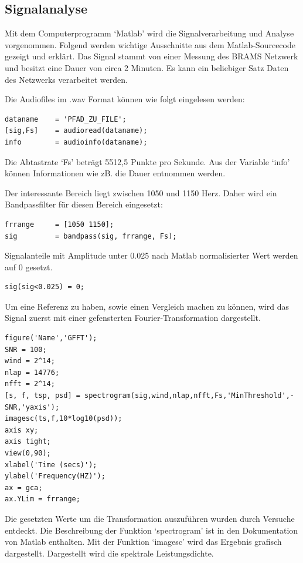 \begin{refsection}
\newpage
\subsection{Signalanalyse}
Mit dem Computerprogramm `Matlab' wird die Signalverarbeitung und Analyse vorgenommen.
Folgend werden wichtige Ausschnitte aus dem Matlab-Sourcecode gezeigt und erklärt.
Das Signal stammt von einer Messung des BRAMS Netzwerk und besitzt eine Dauer von circa 2 Minuten.
Es kann ein beliebiger Satz Daten des Netzwerks verarbeitet werden.

Die Audiofiles im .wav Format können wie folgt eingelesen werden:
\begin{lstlisting}
dataname    = 'PFAD_ZU_FILE';
[sig,Fs]    = audioread(dataname);
info        = audioinfo(dataname);
\end{lstlisting}
Die Abtastrate `Fs' beträgt 5512,5 Punkte pro Sekunde.
Aus der Variable `info' können Informationen wie zB. die Dauer entnommen werden. 

Der interessante Bereich liegt zwischen 1050 und 1150 Herz.
Daher wird ein Bandpassfilter für diesen Bereich eingesetzt:
\begin{lstlisting}
frrange     = [1050 1150];
sig         = bandpass(sig, frrange, Fs);
\end{lstlisting}

Signalanteile mit Amplitude unter 0.025 nach Matlab normalisierter Wert werden auf 0 gesetzt.
\begin{lstlisting}
sig(sig<0.025) = 0;
\end{lstlisting}

Um eine Referenz zu haben, sowie einen Vergleich machen zu können, wird das Signal zuerst mit einer gefensterten Fourier-Transformation dargestellt. 
\begin{lstlisting}
figure('Name','GFFT');
SNR = 100;
wind = 2^14;
nlap = 14776;
nfft = 2^14;
[s, f, tsp, psd] = spectrogram(sig,wind,nlap,nfft,Fs,'MinThreshold',-SNR,'yaxis');
imagesc(ts,f,10*log10(psd));
axis xy; 
axis tight; 
view(0,90);
xlabel('Time (secs)');
ylabel('Frequency(HZ)');
ax = gca;
ax.YLim = frrange;
\end{lstlisting}

\newpage
Die gesetzten Werte um die Transformation auszuführen wurden durch Versuche entdeckt. 
Die Beschreibung der Funktion `spectrogram' ist in den Dokumentation von Matlab enthalten.
Mit der Funktion `imagesc' wird das Ergebnis grafisch dargestellt.
Dargestellt wird die spektrale Leistungsdichte.


\end{refsection}
